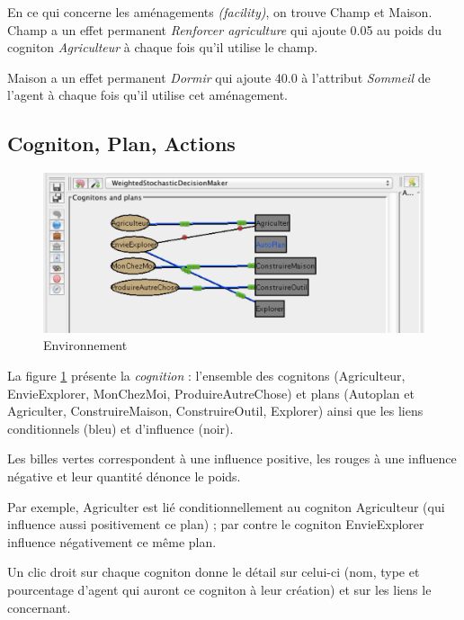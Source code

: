 En ce qui concerne les aménagements \textit{(facility)}, on trouve Champ et Maison.
Champ a un effet permanent \textit{Renforcer agriculture } qui ajoute  0.05 au poids du cogniton \textit{Agriculteur} à chaque fois qu'il utilise le champ.

Maison a un effet permanent \textit{Dormir} qui ajoute 40.0 à l'attribut \textit{Sommeil} de l'agent à chaque fois qu'il utilise cet aménagement.

\subsection{Cogniton, Plan, Actions}



\begin{figure}[!ht]
\begin{center}
\includegraphics[scale=0.5]{DocumentationSimulation/CogPl.pdf}
\caption[CP]{Environnement \\}
\label{CP}
\end{center}
\end{figure} 

La figure \ref{CP} présente la \textit{cognition} : l'ensemble des cognitons (Agriculteur, EnvieExplorer, MonChezMoi, ProduireAutreChose) et plans (Autoplan et Agriculter, ConstruireMaison, ConstruireOutil, Explorer) ainsi que les liens conditionnels (bleu) et d'influence (noir).

Les billes vertes correspondent à une influence positive, les rouges à une influence négative et leur quantité dénonce le poids.

Par exemple, Agriculter est lié conditionnellement au cogniton Agriculteur (qui influence aussi positivement ce plan) ; par contre  le cogniton EnvieExplorer influence négativement ce même plan.

Un clic droit sur chaque cogniton donne le détail sur celui-ci (nom, type et pourcentage d'agent qui auront ce cogniton à leur création) et sur les liens le concernant.

